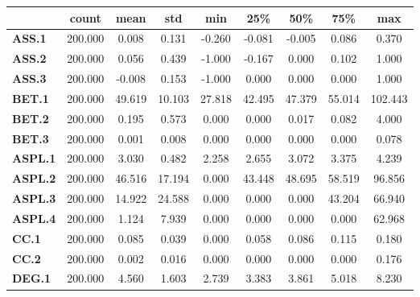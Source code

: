 \documentclass[
	article,			%
	11pt,				%
	oneside,			%
	a4paper,			%
	english,			%
	brazil,				%
	sumario=tradicional
	]{abntex2}
\begin{document}
\newpage
\begin{table}[H]
\small
\centering
\begin{tabular}{l|c|c|c|c|c|c|c|c|}
\cline{2-9}
                                      & count   & mean     & std      & min     & 25\%    & 50\%     & 75\%     & max       \\ \hline
\multicolumn{1}{|l|}{\textbf{ASS.1}}  & 200.000 & 0.008    & 0.131    & -0.260  & -0.081  & -0.005   & 0.086    & 0.370     \\ \hline
\multicolumn{1}{|l|}{\textbf{ASS.2}}  & 200.000 & 0.056    & 0.439    & -1.000  & -0.167  & 0.000    & 0.102    & 1.000     \\ \hline
\multicolumn{1}{|l|}{\textbf{ASS.3}}  & 200.000 & -0.008   & 0.153    & -1.000  & 0.000   & 0.000    & 0.000    & 1.000     \\ \hline
\multicolumn{1}{|l|}{\textbf{BET.1}}  & 200.000 & 49.619   & 10.103   & 27.818  & 42.495  & 47.379   & 55.014   & 102.443   \\ \hline
\multicolumn{1}{|l|}{\textbf{BET.2}}  & 200.000 & 0.195    & 0.573    & 0.000   & 0.000   & 0.017    & 0.082    & 4.000     \\ \hline
\multicolumn{1}{|l|}{\textbf{BET.3}}  & 200.000 & 0.001    & 0.008    & 0.000   & 0.000   & 0.000    & 0.000    & 0.078     \\ \hline
\multicolumn{1}{|l|}{\textbf{ASPL.1}} & 200.000 & 3.030    & 0.482    & 2.258   & 2.655   & 3.072    & 3.375    & 4.239     \\ \hline
\multicolumn{1}{|l|}{\textbf{ASPL.2}} & 200.000 & 46.516   & 17.194   & 0.000   & 43.448  & 48.695   & 58.519   & 96.856    \\ \hline
\multicolumn{1}{|l|}{\textbf{ASPL.3}} & 200.000 & 14.922   & 24.588   & 0.000   & 0.000   & 0.000    & 43.204   & 66.940    \\ \hline
\multicolumn{1}{|l|}{\textbf{ASPL.4}} & 200.000 & 1.124    & 7.939    & 0.000   & 0.000   & 0.000    & 0.000    & 62.968    \\ \hline
\multicolumn{1}{|l|}{\textbf{CC.1}}   & 200.000 & 0.085    & 0.039    & 0.000   & 0.058   & 0.086    & 0.115    & 0.180     \\ \hline
\multicolumn{1}{|l|}{\textbf{CC.2}}   & 200.000 & 0.002    & 0.016    & 0.000   & 0.000   & 0.000    & 0.000    & 0.176     \\ \hline
\multicolumn{1}{|l|}{\textbf{DEG.1}}  & 200.000 & 4.560    & 1.603    & 2.739   & 3.383   & 3.861    & 5.018    & 8.230     \\ \hline

\end{tabular}
\end{table}
\end{document}
